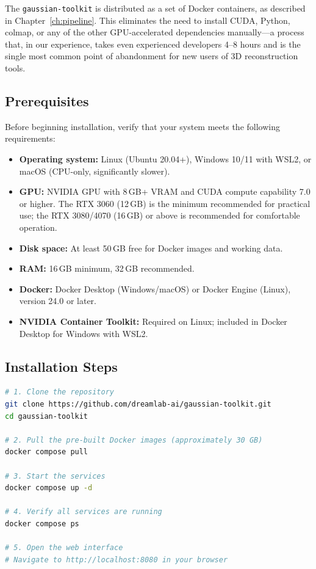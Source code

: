 The \texttt{gaussian-toolkit} is distributed as a set of Docker containers, as described in Chapter~\ref{ch:pipeline}. This eliminates the need to install CUDA, Python, \acrshort{colmap}, or any of the other GPU-accelerated dependencies manually---a process that, in our experience, takes even experienced developers 4--8 hours and is the single most common point of abandonment for new users of 3D reconstruction tools.

\subsection{Prerequisites}

Before beginning installation, verify that your system meets the following requirements:

\begin{itemize}
  \item \textbf{Operating system:} Linux (Ubuntu 20.04+), Windows 10/11 with WSL2, or macOS (CPU-only, significantly slower).
  \item \textbf{GPU:} NVIDIA GPU with 8\,GB+ VRAM and CUDA compute capability 7.0 or higher. The RTX 3060 (12\,GB) is the minimum recommended for practical use; the RTX 3080/4070 (16\,GB) or above is recommended for comfortable operation.
  \item \textbf{Disk space:} At least 50\,GB free for Docker images and working data.
  \item \textbf{RAM:} 16\,GB minimum, 32\,GB recommended.
  \item \textbf{Docker:} Docker Desktop (Windows/macOS) or Docker Engine (Linux), version 24.0 or later.
  \item \textbf{NVIDIA Container Toolkit:} Required on Linux; included in Docker Desktop for Windows with WSL2.
\end{itemize}

\subsection{Installation Steps}

\begin{lstlisting}[language=bash, caption={Installing the \texttt{gaussian-toolkit}.}, label={lst:install}]
# 1. Clone the repository
git clone https://github.com/dreamlab-ai/gaussian-toolkit.git
cd gaussian-toolkit

# 2. Pull the pre-built Docker images (approximately 30 GB)
docker compose pull

# 3. Start the services
docker compose up -d

# 4. Verify all services are running
docker compose ps

# 5. Open the web interface
# Navigate to http://localhost:8080 in your browser
\end{lstlisting}

